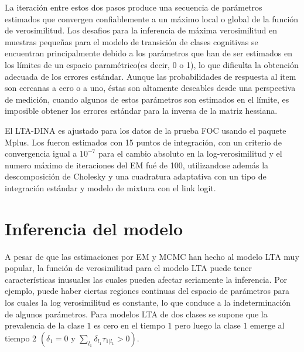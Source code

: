 	La iteraci\'{o}n entre estos dos pasos produce una secuencia de par\'{a}metros estimados que convergen confiablemente a un m\'{a}ximo local o global de la funci\'{o}n de verosimilitud.
	Los desafios para la inferencia de m\'{a}xima verosimilitud en muestras peque\~{n}as para el modelo de transici\'{o}n de clases cognitivas se encuentran principalmente debido a los par\'{a}metros que han de ser estimados en los l\'{i}mites de un espacio param\'{e}trico(es decir, 0 o 1), lo que dificulta la obtenci\'{o}n adecuada de los errores est\'{a}ndar.
	Aunque las probabilidades de respuesta al item son cercanas a cero o a uno, \'{e}stas son altamente deseables desde una perspectiva de medici\'{o}n, cuando algunos de estos par\'{a}metros son estimados en el l\'{i}mite, es imposible obtener los errores est\'{a}ndar para la inversa de la matriz hessiana. 

El LTA-DINA es ajustado para los datos de la prueba FOC usando el paquete Mplus. Los fueron estimados con 15 puntos de integración, con un criterio de convergencia igual a $10^{-7}$ para el cambio absoluto en la log-verosimilitud y el numero máximo de iteraciones del EM fué de 100, utilizandose además la descomposición de Cholesky y una cuadratura adaptativa con un tipo de integración estándar y modelo de mixtura con el link logit.  	     
	
	
	\section{Inferencia del modelo}
	A pesar de que las estimaciones por EM y MCMC han hecho al modelo LTA muy popular, la funci\'{o}n de verosimilitud para el modelo LTA puede tener caracter\'{i}sticas inusuales las cuales pueden afectar seriamente la inferencia. Por ejemplo, puede haber ciertas regiones continuas del espacio de par\'{a}metros para los cuales la log verosimilitud  es constante, lo que conduce a la indeterminaci\'{o}n de algunos par\'{a}metros. Para modelos LTA de dos clases se supone que la prevalencia de la clase $1$ es cero en el tiempo $1$ pero luego la clase $1$ emerge al tiempo $2$ 
	$(\delta_{1}=0 \text { y } \sum_{l_{1}} \delta_{l_{1}} \tau_{1 | l_{1}}>0)$.
	
	
